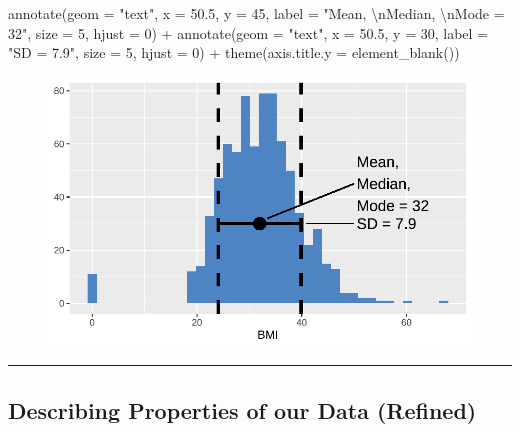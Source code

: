 \documentclass[
  letterpaper,
  DIV=11,
  numbers=noendperiod]{scrreprt}
\newenvironment{Shaded}{\begin{snugshade}}{\end{snugshade}}
\newcommand{\AttributeTok}[1]{\textcolor[rgb]{0.40,0.45,0.13}{#1}}
\newcommand{\DecValTok}[1]{\textcolor[rgb]{0.68,0.00,0.00}{#1}}
\newcommand{\FloatTok}[1]{\textcolor[rgb]{0.68,0.00,0.00}{#1}}
\newcommand{\FunctionTok}[1]{\textcolor[rgb]{0.28,0.35,0.67}{#1}}
\newcommand{\NormalTok}[1]{\textcolor[rgb]{0.00,0.23,0.31}{#1}}
\newcommand{\SpecialCharTok}[1]{\textcolor[rgb]{0.37,0.37,0.37}{#1}}
\newcommand{\StringTok}[1]{\textcolor[rgb]{0.13,0.47,0.30}{#1}}
\begin{document}
\begin{Shaded}
\begin{Highlighting}[]
  \FunctionTok{annotate}\NormalTok{(}\AttributeTok{geom =} \StringTok{"text"}\NormalTok{, }\AttributeTok{x =} \FloatTok{50.5}\NormalTok{, }\AttributeTok{y =} \DecValTok{45}\NormalTok{, }\AttributeTok{label =} \StringTok{"Mean, }\SpecialCharTok{\textbackslash{}n}\StringTok{Median, }\SpecialCharTok{\textbackslash{}n}\StringTok{Mode = 32"}\NormalTok{, }\AttributeTok{size =} \DecValTok{5}\NormalTok{, }\AttributeTok{hjust =} \DecValTok{0}\NormalTok{) }\SpecialCharTok{+}
  \FunctionTok{annotate}\NormalTok{(}\AttributeTok{geom =} \StringTok{"text"}\NormalTok{, }\AttributeTok{x =} \FloatTok{50.5}\NormalTok{, }\AttributeTok{y =} \DecValTok{30}\NormalTok{, }\AttributeTok{label =} \StringTok{"SD = 7.9"}\NormalTok{, }\AttributeTok{size =} \DecValTok{5}\NormalTok{, }\AttributeTok{hjust =} \DecValTok{0}\NormalTok{) }\SpecialCharTok{+}
  \FunctionTok{theme}\NormalTok{(}\AttributeTok{axis.title.y =} \FunctionTok{element\_blank}\NormalTok{()) }
\end{Highlighting}
\end{Shaded}

\begin{figure}[H]

{\centering \includegraphics{./TransformingLikeDataTrans_files/figure-pdf/unnamed-chunk-3-1.pdf}

}

\end{figure}

\begin{center}\rule{0.5\linewidth}{0.5pt}\end{center}

\hypertarget{describing-properties-of-our-data-refined}{%
\subsection{Describing Properties of our Data
(Refined)}\label{describing-properties-of-our-data-refined}}
\end{document}
